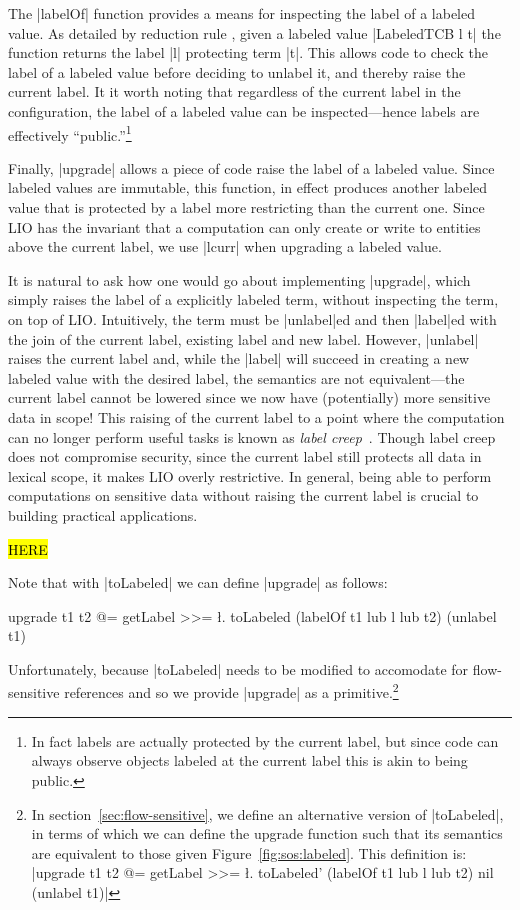 The |labelOf| function provides a means for inspecting the label of a
labeled value.
%
As detailed by reduction rule , given a labeled value
|LabeledTCB l t| the function returns the label |l| protecting term
|t|.
%
This allows code to check the label of a labeled value before deciding
to unlabel it, and thereby raise the current label.
%
It it worth noting that regardless of the current label in the
configuration, the label of a labeled value can be inspected---hence
labels are effectively ``public.''\footnote{
In fact labels are actually protected by the current label, but since
code can always observe objects labeled at the current label this is
akin to being public.
}

Finally, |upgrade| allows a piece of code raise the label of a
labeled value.
%
Since labeled values are immutable, this function, in effect produces
another labeled value that is protected by a label more restricting
than the current one.
%
Since LIO has the invariant that a computation can only create or
write to entities above the current label, we use |lcurr| when
upgrading a labeled value.

It is natural to ask how one would go about implementing |upgrade|,
which simply raises the label of a explicitly labeled term, without
inspecting the term, on top of LIO.
%
Intuitively, the term must be |unlabel|ed and then |label|ed with the
join of the current label, existing label and new label.
%
However, |unlabel| raises the current label and, while the |label|
will succeed in creating a new labeled value with the desired label,
the semantics are not equivalent---the current label cannot be lowered
since we now have (potentially) more sensitive data in scope!
%
This raising of the current label to a point where the computation can
no longer perform useful tasks is known as \emph{label
creep}~\cite{sabelfeld:language-based-iflow}.
%
Though label creep does not compromise security, since the current
label still protects all data in lexical scope, it makes LIO overly
restrictive.
%
In general, being able to perform computations on sensitive data
without raising the current label is crucial to building practical
applications.

\hl{HERE}

Note that with |toLabeled| we can define |upgrade| as follows:
\begin{code}
upgrade t1 t2 @= getLabel >>= \l.
  toLabeled (labelOf t1 lub l lub t2) (unlabel t1)
\end{code}
Unfortunately, because |toLabeled| needs to be modified to accomodate
for flow-sensitive references and so we provide |upgrade| as a
primitive.\footnote{
In section~\ref{sec:flow-sensitive}, we define an alternative
version of |toLabeled|, in terms of which we can define the
upgrade function such that its semantics are equivalent to those
given Figure~\ref{fig:sos:labeled}. This definition is:
|upgrade t1 t2 @= getLabel >>= \l.
  toLabeled' (labelOf t1 lub l lub t2) nil (unlabel t1)|
}


